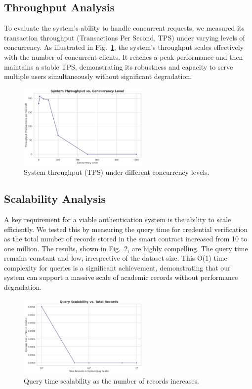 \documentclass[lettersize,journal]{IEEEtran}
\begin{document}
\begin{itemize}
\subsection{Throughput Analysis}
To evaluate the system's ability to handle concurrent requests, we measured its transaction throughput (Transactions Per Second, TPS) under varying levels of concurrency. As illustrated in Fig.~\ref{fig:throughput}, the system's throughput scales effectively with the number of concurrent clients. It reaches a peak performance and then maintains a stable TPS, demonstrating its robustness and capacity to serve multiple users simultaneously without significant degradation.

\begin{figure}[!t]
\centering
\includegraphics[width=2.5in]{figures/fig2_throughput.png}
\caption{System throughput (TPS) under different concurrency levels.}
\label{fig:throughput}
\end{figure}

\subsection{Scalability Analysis}
A key requirement for a viable authentication system is the ability to scale efficiently. We tested this by measuring the query time for credential verification as the total number of records stored in the smart contract increased from 10 to one million. The results, shown in Fig.~\ref{fig:scalability}, are highly compelling. The query time remains constant and low, irrespective of the dataset size. This O(1) time complexity for queries is a significant achievement, demonstrating that our system can support a massive scale of academic records without performance degradation.

\begin{figure}[!t]
\centering
\includegraphics[width=2.5in]{figures/fig3_scalability.png}
\caption{Query time scalability as the number of records increases.}
\label{fig:scalability}
\end{figure}


\end{itemize}
\end{document}
